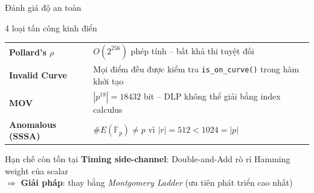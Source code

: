 \begin{frame}{Đánh giá độ an toàn}
  \begin{block}{4 loại tấn công kinh điển}
    \small
    \begin{tabular}{p{3.5cm}p{7.5cm}}
      \textbf{Pollard's $\rho$} & $O(2^{256})$ phép tính -- bất khả thi tuyệt đối \\[3pt]
      \textbf{Invalid Curve} & Mọi điểm đều được kiểm tra \texttt{is\_on\_curve()} trong hàm khởi tạo \\[3pt]
      \textbf{MOV} & $|p^{18}| = 18432$ bit -- DLP không thể giải bằng index calculus \\[3pt]
      \textbf{Anomalous (SSSA)} & $\#E(\mathbb{F}_p) \neq p$ vì $|r|=512 < 1024=|p|$ \\
    \end{tabular}
  \end{block}
  \begin{alertblock}{Hạn chế còn tồn tại}
    \textbf{Timing side-channel}: Double-and-Add rò rỉ Hamming weight của scalar\\
    $\Rightarrow$ \textbf{Giải pháp}: thay bằng \emph{Montgomery Ladder} (ưu tiên phát triển cao nhất)
  \end{alertblock}
\end{frame}
